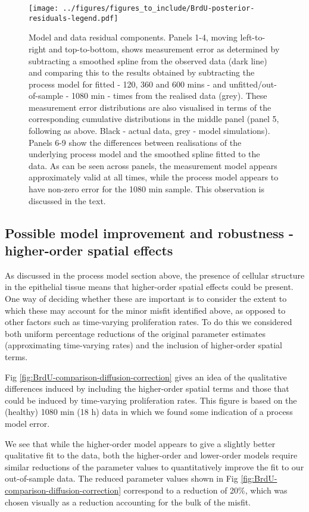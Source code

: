 \documentclass[10pt,letterpaper]{article}
\begin{document}
\begin{figure}
\centering
\texttt{[image: ../figures/figures\_to\_include/BrdU-posterior-residuals-legend.pdf]}
\caption{Model and data residual components. Panels 1-4, moving
left-to-right and top-to-bottom, shows measurement error as determined
by subtracting a smoothed spline from the observed data (dark line) and
comparing this to the results obtained by subtracting the process model
for fitted - 120, 360 and 600 mins - and unfitted/out-of-sample - 1080
min - times from the realised data (grey). These measurement error
distributions are also visualised in terms of the corresponding
cumulative distributions in the middle panel (panel 5, following as
above. Black - actual data, grey - model simulations). Panels 6-9 show
the differences between realisations of the underlying process model and
the smoothed spline fitted to the data. As can be seen across panels,
the measurement model appears approximately valid at all times, while
the process model appears to have non-zero error for the 1080 min
sample. This observation is discussed in the
text.\label{fig:BrdU-posterior-residuals}}
\end{figure}

\subsection{Possible model improvement and robustness - higher-order
spatial
effects}\label{possible-model-improvement-and-robustness---higher-order-spatial-effects}

As discussed in the process model section above, the presence of
cellular structure in the epithelial tissue means that higher-order
spatial effects could be present. One way of deciding whether these are
important is to consider the extent to which these may account for the
minor misfit identified above, as opposed to other factors such as
time-varying proliferation rates. To do this we considered both uniform
percentage reductions of the original parameter estimates (approximating
time-varying rates) and the inclusion of higher-order spatial terms.

Fig \ref{fig:BrdU-comparison-diffusion-correction} gives an idea of the
qualitative differences induced by including the higher-order spatial
terms and those that could be induced by time-varying proliferation
rates. This figure is based on the (healthy) 1080 min (18 h) data in
which we found some indication of a process model error.

We see that while the higher-order model appears to give a slightly
better qualitative fit to the data, both the higher-order and
lower-order models require similar reductions of the parameter values to
quantitatively improve the fit to our out-of-sample data. The reduced
parameter values shown in Fig
\ref{fig:BrdU-comparison-diffusion-correction} correspond to a reduction
of 20\%, which was chosen visually as a reduction accounting for the
bulk of the misfit.
\end{document}

